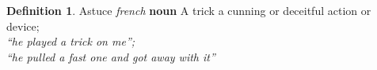 \documentclass{article}
\title{}
\author{K. M. Short}
\date{2016-01-19}
\theoremstyle{plain}
\theoremstyle{definition}
\newtheorem*{defn}{Definition}
\begin{document}
\begin{defn}{Astuce}\newline
\textit{french} \newline
\textbf{noun} \newline
A trick \newline
a cunning or deceitful action or device; \\
\textit{“he played a trick on me”; \\
“he pulled a fast one and got away with it”}
\end{defn}
\end{document}
